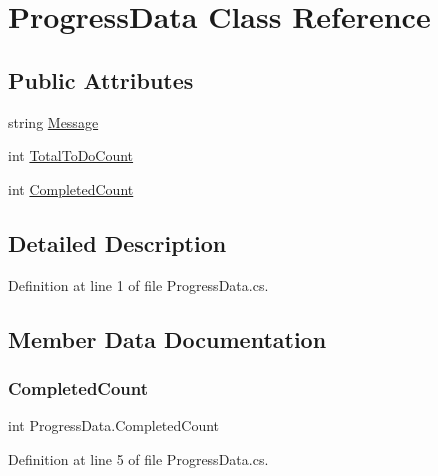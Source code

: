 \hypertarget{class_progress_data}{}\section{Progress\+Data Class Reference}
\label{class_progress_data}
\subsection*{Public Attributes}
\begin{DoxyCompactItemize}
\item 
string \mbox{\hyperlink{class_progress_data_aef6d1fae14a8aca09596ec591b295f19}{Message}}
\item 
int \mbox{\hyperlink{class_progress_data_a492f8d3bcace30ba4b1ed320e1ca7823}{Total\+To\+Do\+Count}}
\item 
int \mbox{\hyperlink{class_progress_data_a2a29b5afc1fc19673c81e615edbdda03}{Completed\+Count}}
\end{DoxyCompactItemize}


\subsection{Detailed Description}


Definition at line 1 of file Progress\+Data.\+cs.



\subsection{Member Data Documentation}
\mbox{\label{class_progress_data_a2a29b5afc1fc19673c81e615edbdda03}} 
\subsubsection{\texorpdfstring{CompletedCount}{CompletedCount}}
{\footnotesize\ttfamily int Progress\+Data.\+Completed\+Count}



Definition at line 5 of file Progress\+Data.\+cs.

\mbox{\label{class_progress_data_aef6d1fae14a8aca09596ec591b295f19}} 
